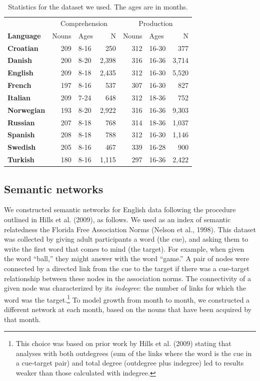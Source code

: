\documentclass[english,,man,floatsintext]{apa6}
\let\rmarkdownfootnote\footnote%
\def\footnote{\protect\rmarkdownfootnote}
\begin{document}
\begin{table}

\caption{\label{tab:stats}Statistics for the dataset we used. The ages are in months.}
\centering
\begin{tabular}[t]{>{\bfseries}lrlrrlr}
\toprule
\multicolumn{1}{c}{} & \multicolumn{3}{c}{Comprehension} & \multicolumn{3}{c}{Production} \\
\cmidrule(l{3pt}r{3pt}){2-4} \cmidrule(l{3pt}r{3pt}){5-7}
Language & Nouns & Ages & N & Nouns & Ages & N\\
\midrule
Croatian & 209 & 8-16 & 250 & 312 & 16-30 & 377\\
Danish & 200 & 8-20 & 2,398 & 316 & 16-36 & 3,714\\
English & 209 & 8-18 & 2,435 & 312 & 16-30 & 5,520\\
French & 197 & 8-16 & 537 & 307 & 16-30 & 827\\
Italian & 209 & 7-24 & 648 & 312 & 18-36 & 752\\
Norwegian & 193 & 8-20 & 2,922 & 316 & 16-36 & 9,303\\
Russian & 207 & 8-18 & 768 & 314 & 18-36 & 1,037\\
Spanish & 208 & 8-18 & 788 & 312 & 16-30 & 1,146\\
Swedish & 205 & 8-16 & 467 & 339 & 16-28 & 900\\
Turkish & 180 & 8-16 & 1,115 & 297 & 16-36 & 2,422\\
\bottomrule
\end{tabular}
\end{table}

\hypertarget{semantic-networks}{%
\subsection{Semantic networks}\label{semantic-networks}}

We constructed semantic networks for English data following the procedure outlined in Hills et al. (2009), as follows. We used as an index of semantic relatedness the Florida Free Association Norms (Nelson et al., 1998). This dataset was collected by giving adult participants a word (the cue), and asking them to write the first word that comes to mind (the target). For example, when given the word \enquote{ball,} they might answer with the word \enquote{game.} A pair of nodes were connected by a directed link from the cue to the target if there was a cue-target relationship between these nodes in the association norms. The connectivity of a given node was characterized by its \emph{indegree}: the number of links for which the word was the target.\footnote{This choice was based on prior work by Hills et al. (2009) stating that analyses with both outdegrees (sum of the links where the word is the cue in a cue-target pair) and total degree  (outdegree plus indegree) led to results weaker than those calculated with indegree.} To model growth from month to month, we constructed a different network at each month, based on the nouns that have been acquired by that month.
\end{document}
